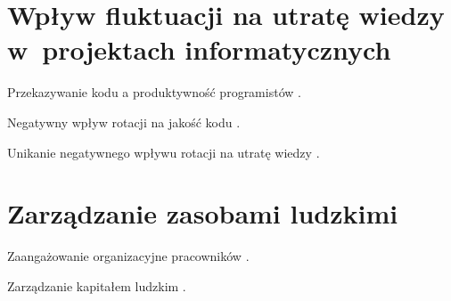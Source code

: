 \begin{minipage}{\textwidth}
\begin{table}[H]
\begin{center}
\begin{tabular}{|P{.2\textwidth}|P{.7\textwidth}|}
                         \hline

                     \end{tabular}
                 \end{center}
                 \raggedright{}
                 \vspace{0.75cm}
             \end{table}
\end{minipage}
%
%
%
%
%



\section{Wpływ fluktuacji na utratę wiedzy w~projektach informatycznych}\label{sec:it-knowledge-loss}

Przekazywanie kodu a produktywność programistów \cite{mockus-2009}.

Negatywny wpływ rotacji na jakość kodu \cite{donadelli-2015}.

Unikanie negatywnego wpływu rotacji na utratę wiedzy \cite{rigby-2016}.


\section{Zarządzanie zasobami ludzkimi}\label{sec:it-project-management}

Zaangażowanie organizacyjne pracowników \cite{rosinski-2012}.

Zarządzanie kapitałem ludzkim \cite{brylka-2019}.

\thispagestyle{normal}

